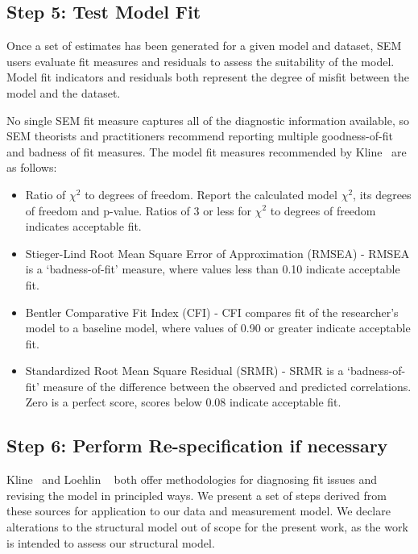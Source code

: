 \subsection{Step 5: Test Model Fit}
Once a set of estimates has been generated for a given model and dataset, SEM users evaluate fit measures and residuals to assess the suitability of the model. Model fit indicators and residuals both represent the degree of misfit between the model and the dataset. 

No single SEM fit measure captures all of the diagnostic information available, so SEM theorists and practitioners recommend reporting multiple goodness-of-fit and badness of fit measures.
The model fit measures recommended by Kline~\cite{kline2015principles} are as follows:
\begin{itemize}
	\item Ratio of $\chi^2$ to degrees of freedom. Report the calculated model $\chi^2$, its degrees of freedom and p-value. Ratios of 3 or less for $\chi^2$ to degrees of freedom indicates acceptable fit.
	\item Stieger-Lind Root Mean Square Error of Approximation (RMSEA) - RMSEA is a `badness-of-fit' measure, where values less than 0.10 indicate acceptable fit.
	\item Bentler Comparative Fit Index (CFI) - CFI compares fit of the researcher's model to a baseline model, where values of 0.90 or greater indicate acceptable fit.
	\item Standardized Root Mean Square Residual (SRMR) - SRMR is a `badness-of-fit' measure of the difference between the observed and predicted correlations. Zero is a perfect score, scores below 0.08 indicate acceptable fit.
\end{itemize}

\subsection{Step 6: Perform Re-specification if necessary}
Kline~\cite{kline2015principles} and Loehlin ~\cite{loehlin2004principles} both offer methodologies for diagnosing fit issues and revising the model in principled ways. We present a set of steps derived from these sources for application to our data and measurement model. We declare alterations to the structural model out of scope for the present work, as the work is intended to assess our structural model. 

